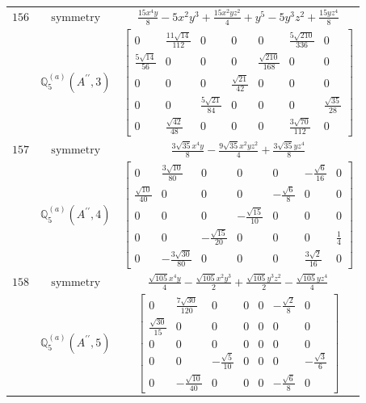 \documentclass[fleqn,8pt,landscape]{jsarticle}
\begin{document}
\begin{longtable}{ccc}
$ 156 $ & $ \text{symmetry} $ & $ \frac{15 x^{4} y}{8} - 5 x^{2} y^{3} + \frac{15 x^{2} y z^{2}}{4} + y^{5} - 5 y^{3} z^{2} + \frac{15 y z^{4}}{8} $ \\
$  $ & $ \mathbb{Q}_{5}^{(a)}(A^{\prime\prime},3) $ & $ \begin{bmatrix} 0 & \frac{11 \sqrt{14}}{112} & 0 & 0 & 0 & \frac{5 \sqrt{210}}{336} & 0 \\ \frac{5 \sqrt{14}}{56} & 0 & 0 & 0 & \frac{\sqrt{210}}{168} & 0 & 0 \\ 0 & 0 & 0 & \frac{\sqrt{21}}{42} & 0 & 0 & 0 \\ 0 & 0 & \frac{5 \sqrt{21}}{84} & 0 & 0 & 0 & \frac{\sqrt{35}}{28} \\ 0 & \frac{\sqrt{42}}{48} & 0 & 0 & 0 & \frac{3 \sqrt{70}}{112} & 0 \end{bmatrix} $ \\ \hline
$ 157 $ & $ \text{symmetry} $ & $ \frac{3 \sqrt{35} x^{4} y}{8} - \frac{9 \sqrt{35} x^{2} y z^{2}}{4} + \frac{3 \sqrt{35} y z^{4}}{8} $ \\
$  $ & $ \mathbb{Q}_{5}^{(a)}(A^{\prime\prime},4) $ & $ \begin{bmatrix} 0 & \frac{3 \sqrt{10}}{80} & 0 & 0 & 0 & - \frac{\sqrt{6}}{16} & 0 \\ \frac{\sqrt{10}}{40} & 0 & 0 & 0 & - \frac{\sqrt{6}}{8} & 0 & 0 \\ 0 & 0 & 0 & - \frac{\sqrt{15}}{10} & 0 & 0 & 0 \\ 0 & 0 & - \frac{\sqrt{15}}{20} & 0 & 0 & 0 & \frac{1}{4} \\ 0 & - \frac{3 \sqrt{30}}{80} & 0 & 0 & 0 & \frac{3 \sqrt{2}}{16} & 0 \end{bmatrix} $ \\ \hline
$ 158 $ & $ \text{symmetry} $ & $ \frac{\sqrt{105} x^{4} y}{4} - \frac{\sqrt{105} x^{2} y^{3}}{2} + \frac{\sqrt{105} y^{3} z^{2}}{2} - \frac{\sqrt{105} y z^{4}}{4} $ \\
$  $ & $ \mathbb{Q}_{5}^{(a)}(A^{\prime\prime},5) $ & $ \begin{bmatrix} 0 & \frac{7 \sqrt{30}}{120} & 0 & 0 & 0 & - \frac{\sqrt{2}}{8} & 0 \\ \frac{\sqrt{30}}{15} & 0 & 0 & 0 & 0 & 0 & 0 \\ 0 & 0 & 0 & 0 & 0 & 0 & 0 \\ 0 & 0 & - \frac{\sqrt{5}}{10} & 0 & 0 & 0 & - \frac{\sqrt{3}}{6} \\ 0 & - \frac{\sqrt{10}}{40} & 0 & 0 & 0 & - \frac{\sqrt{6}}{8} & 0 \end{bmatrix} $ \\ \hline

\end{longtable}
\end{document}
